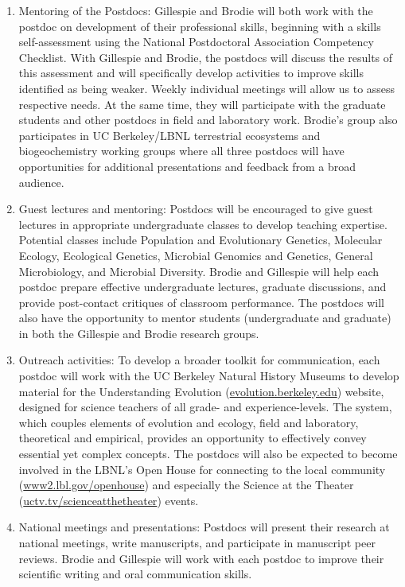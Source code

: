 \documentclass[11pt]{article}
\begin{document}
\begin{enumerate}
\item Mentoring of the Postdocs: Gillespie and Brodie will both work
  with the postdoc on development of their professional skills,
  beginning with a skills self-assessment using the National
  Postdoctoral Association Competency Checklist. With Gillespie and
  Brodie, the postdocs will discuss the results of this assessment and
  will specifically develop activities to improve skills identified as
  being weaker. Weekly individual meetings will allow us to assess
  respective needs.  At the same time, they will participate with the
  graduate students and other postdocs in field and laboratory
  work. Brodie's group also participates in UC Berkeley/LBNL
  terrestrial ecosystems and biogeochemistry working groups where all
  three postdocs will have opportunities for additional presentations
  and feedback from a broad audience.
\item Guest lectures and mentoring: Postdocs will be encouraged to
  give guest lectures in appropriate undergraduate classes to
  develop teaching expertise. Potential classes include Population and
  Evolutionary Genetics, Molecular Ecology, Ecological Genetics,
  Microbial Genomics and Genetics, General Microbiology, and Microbial
  Diversity. Brodie and Gillespie will help each postdoc prepare
  effective undergraduate lectures, graduate discussions, and provide
  post-contact critiques of classroom performance. The postdocs will
  also have the opportunity to mentor students (undergraduate and
  graduate) in both the Gillespie and Brodie research groups.
\item Outreach activities: To develop a broader toolkit for
  communication, each postdoc will work with the UC Berkeley Natural
  History Museums to develop material for the Understanding Evolution
  (\url{evolution.berkeley.edu}) website, designed for science
  teachers of all grade- and experience-levels. The system, which
  couples elements of evolution and ecology, field and laboratory,
  theoretical and empirical, provides an opportunity to effectively
  convey essential yet complex concepts. The postdocs will also be
  expected to become involved in the LBNL's Open House for connecting
  to the local community (\url{www2.lbl.gov/openhouse}) and especially
  the Science at the Theater (\url{uctv.tv/scienceatthetheater})
  events.
\item National meetings and presentations: Postdocs will present their
  research at national meetings, write manuscripts, and participate in
  manuscript peer reviews. Brodie and Gillespie will work with each
  postdoc to improve their scientific writing and oral communication
  skills.
\end{enumerate}

\end{document}
